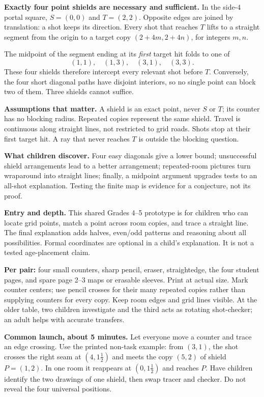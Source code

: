 \documentclass[11pt,letterpaper]{article}
\newcommand{\sectiontitle}[1]{\par\vspace{4pt}{\large\bfseries #1}\par}
\begin{document}
\sectiontitle{The mathematics first}
\textbf{Exactly four point shields are necessary and sufficient.} In the side-$4$ portal square, $S=(0,0)$ and $T=(2,2)$. Opposite edges are joined by translation: a shot keeps its direction. Every shot that reaches $T$ lifts to a straight segment from the origin to a target copy $(2+4m,2+4n)$, for integers $m,n$.

The midpoint of the segment ending at its \emph{first} target hit folds to one of
\[
(1,1),\quad(1,3),\quad(3,1),\quad(3,3).
\]
These four shields therefore intercept every relevant shot before $T$. Conversely, the four short diagonal paths have disjoint interiors, so no single point can block two of them. Three shields cannot suffice.

\textbf{Assumptions that matter.} A shield is an exact point, never $S$ or $T$; its counter has no blocking radius. Repeated copies represent the same shield. Travel is continuous along straight lines, not restricted to grid roads. Shots stop at their first target hit. A ray that never reaches $T$ is outside the blocking question.

\textbf{What children discover.} Four easy diagonals give a lower bound; unsuccessful shield arrangements lead to a better arrangement; repeated-room pictures turn wraparound into straight lines; finally, a midpoint argument upgrades tests to an all-shot explanation. Testing the finite map is evidence for a conjecture, not its proof.

\textbf{Entry and depth.} This shared Grades 4--5 prototype is for children who can locate grid points, match a point across room copies, and trace a straight line. The final explanation adds halves, even/odd patterns and reasoning about all possibilities. Formal coordinates are optional in a child's explanation. It is not a tested age-placement claim.

\sectiontitle{Set up, launch, and a first route}
\textbf{Per pair:} four small counters, sharp pencil, eraser, straightedge, the four student pages, and spare page 2--3 maps or erasable sleeves. Print at actual size. Mark counter centers; use pencil crosses for their many repeated copies rather than supplying counters for every copy. Keep room edges and grid lines visible. At the older table, two children investigate and the third acts as rotating shot-checker; an adult helps with accurate transfers.

\textbf{Common launch, about 5 minutes.} Let everyone move a counter and trace an edge crossing. Use the printed non-task example: from $(3,1)$, the shot crosses the right seam at $(4,1\frac12)$ and meets the copy $(5,2)$ of shield $P=(1,2)$. In one room it reappears at $(0,1\frac12)$ and reaches $P$. Have children identify the two drawings of one shield, then swap tracer and checker. Do not reveal the four universal positions.
\end{document}
